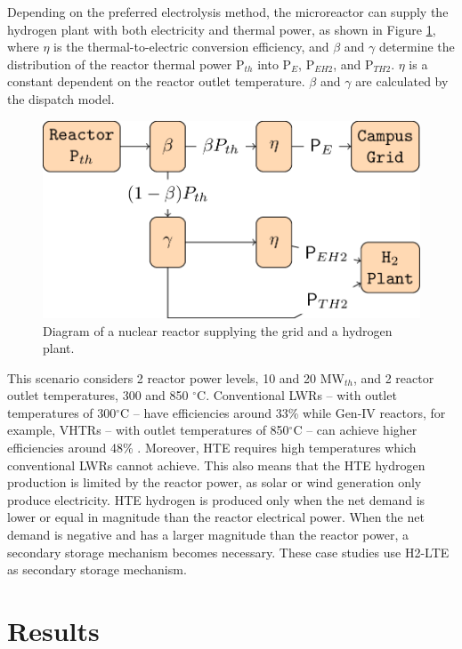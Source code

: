 \documentclass{anstrans}
\begin{document}
Depending on the preferred electrolysis method, the microreactor can supply the hydrogen plant with both electricity and thermal power, as shown in Figure \ref{fig:reactor-hydrogen}, where $\eta$ is the thermal-to-electric conversion efficiency, and $\beta$ and $\gamma$ determine the distribution of the reactor thermal power P$_{th}$ into P$_E$, P$_{EH2}$, and P$_{TH2}$.
$\eta$ is a constant dependent on the reactor outlet temperature.
$\beta$ and $\gamma$ are calculated by the dispatch model.

\begin{figure}[htbp!] %
    \centering
    \includegraphics[width=0.90\linewidth]{figures/reactor-hydrogen}
    \hfill
    \caption{Diagram of a nuclear reactor supplying the grid and a hydrogen plant.}
    \label{fig:reactor-hydrogen}
\end{figure}

This scenario considers 2 reactor power levels, 10 and 20 MW$_{th}$, and 2 reactor outlet temperatures, 300 and 850 $^\circ$C.
Conventional \glspl{LWR} -- with outlet temperatures of 300$^\circ$C -- have efficiencies around 33\% while Gen-IV reactors, for example, \glspl{VHTR} -- with outlet temperatures of 850$^\circ$C -- can achieve higher efficiencies around 48\% \cite{fairhurst-agosta_multi-physics_2020}.
Moreover, HTE requires high temperatures which conventional LWRs cannot achieve.
This also means that the HTE hydrogen production is limited by the reactor power, as solar or wind generation only produce electricity.
HTE hydrogen is produced only when the net demand is lower or equal in magnitude than the reactor electrical power.
When the net demand is negative and has a larger magnitude than the reactor power, a secondary storage mechanism becomes necessary.
These case studies use H2-LTE as secondary storage mechanism.


\section{Results}
\end{document}
